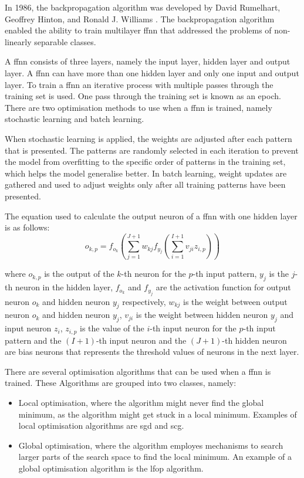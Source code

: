 \documentclass[10pt, conference]{IEEEtran}
\begin{document}
In 1986, the backpropagation algorithm was developed by David Rumelhart, Geoffrey Hinton, and Ronald J. Williams
\cite{backpropagation_ref}. The backpropagation algorithm enabled the ability to train multilayer \acrshort{ffnn}
that addressed the problems of non-linearly separable classes.

A \acrshort{ffnn} consists of three layers, namely the input layer, hidden layer and output layer. A \acrshort{ffnn}
can have more than one hidden layer and only one input and output layer. To train a \acrshort{ffnn} an iterative process
with multiple passes through the training set is used. One pass through the training set is known as an epoch.
There are two optimisation methods to use when a \acrshort{ffnn} is trained, namely stochastic learning and batch learning.

When stochastic learning is applied, the weights are adjusted after each pattern that is presented.
The patterns are randomly selected in each iteration to prevent the model from overfitting to the specific order of
patterns in the training set, which helps the model generalise better. In batch learning, weight updates are gathered
and used to adjust weights only after all training patterns have been presented.

The equation used to calculate the output neuron of a \acrshort{ffnn} with one hidden layer is as follows:
\begin{equation}
    o_{k,p} = f_{o_k} \left( \sum_{j=1}^{J+1} w_{kj}f_{y_j} \left( \sum_{i=1}^{I+1} v_{ji}z_{i,p} \right) \right)
\end{equation}

where $o_{k,p}$ is the output of the $k$-th neuron for the $p$-th input pattern, $y_j$ is the $j$-th neuron in
the hidden layer, $f_{o_k}$ and $f_{y_j}$ are the
activation function for output neuron $o_k$ and hidden neuron $y_j$ respectively, $w_{kj}$ is the weight between
output neuron $o_k$ and hidden neuron $y_j$, $v_{ji}$ is the weight between hidden neuron $y_j$ and input neuron
$z_i$, $z_{i,p}$ is the value of the $i$-th input neuron for the $p$-th input pattern and the $(I+1)$-th input
neuron and the $(J+1)$-th hidden neuron are bias neurons that represents the threshold values of neurons in the
next layer.

There are several optimisation algorithms that can be used when a \acrshort{ffnn} is trained. These Algorithms
are grouped into two classes, namely:
\begin{itemize}
    \item Local optimisation, where the algorithm might never find the global minimum, as the algorithm might get stuck in
            a local minimum. Examples of local optimisation algorithms are \acrshort{sgd} and \acrshort{scg}.
    \item Global optimisation, where the algorithm employes mechanisms to search larger parts of the search space to find 
            the local minimum. An example of a global optimisation algorithm is the \acrshort{lfop} algorithm.
\end{itemize}
\end{document}
